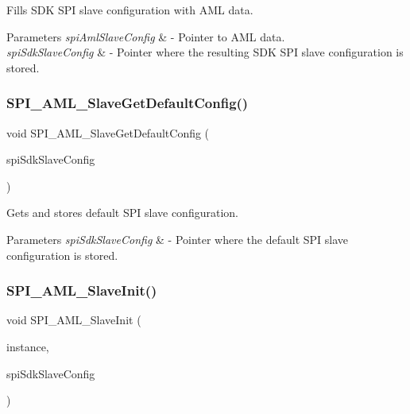 Fills S\+DK S\+PI slave configuration with A\+ML data. 


\begin{DoxyParams}{Parameters}
{\em spi\+Aml\+Slave\+Config} & -\/ Pointer to A\+ML data. \\
\hline
{\em spi\+Sdk\+Slave\+Config} & -\/ Pointer where the resulting S\+DK S\+PI slave configuration is stored. \\
\hline
\end{DoxyParams}
\mbox{\label{group__function__group_ga0728c29744ccb400f0b72ce6718f7128}} 
\subsubsection{\texorpdfstring{SPI\_AML\_SlaveGetDefaultConfig()}{SPI\_AML\_SlaveGetDefaultConfig()}}
{\footnotesize\ttfamily void S\+P\+I\+\_\+\+A\+M\+L\+\_\+\+Slave\+Get\+Default\+Config (\begin{DoxyParamCaption}\item[{spi\+\_\+sdk\+\_\+slave\+\_\+config\+\_\+t $\ast$}]{spi\+Sdk\+Slave\+Config }\end{DoxyParamCaption})}



Gets and stores default S\+PI slave configuration. 


\begin{DoxyParams}{Parameters}
{\em spi\+Sdk\+Slave\+Config} & -\/ Pointer where the default S\+PI slave configuration is stored. \\
\hline
\end{DoxyParams}
\mbox{\label{group__function__group_ga456542ab17179c5e19b712f398c24831}} 
\subsubsection{\texorpdfstring{SPI\_AML\_SlaveInit()}{SPI\_AML\_SlaveInit()}}
{\footnotesize\ttfamily void S\+P\+I\+\_\+\+A\+M\+L\+\_\+\+Slave\+Init (\begin{DoxyParamCaption}\item[{\mbox{\hyperlink{common__aml_8h_a562bd37c7d07adcedec5993bc0cd96e5}{aml\+\_\+instance\+\_\+t}}}]{instance,  }\item[{const spi\+\_\+sdk\+\_\+slave\+\_\+config\+\_\+t $\ast$}]{spi\+Sdk\+Slave\+Config }\end{DoxyParamCaption})}




